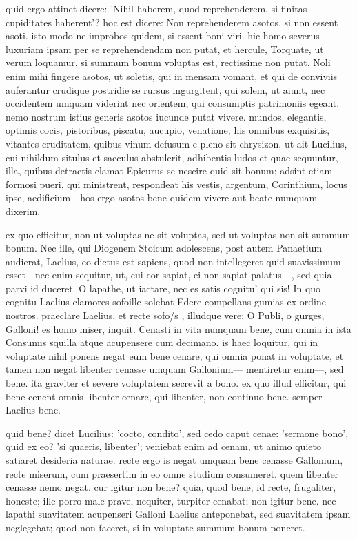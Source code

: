  quid ergo attinet dicere: 'Nihil haberem, quod reprehenderem, si finitas cupiditates haberent'? hoc est dicere: Non reprehenderem asotos, si non essent asoti. isto modo ne improbos quidem, si essent boni viri. hic homo severus luxuriam ipsam per se reprehendendam non putat, et hercule, Torquate, ut verum loquamur, si summum bonum voluptas est, rectissime non putat. Noli enim mihi fingere asotos, ut soletis, qui in mensam vomant, et qui de conviviis auferantur crudique postridie se rursus ingurgitent, qui solem, ut aiunt, nec occidentem umquam viderint nec orientem, qui consumptis patrimoniis egeant. nemo nostrum istius generis asotos iucunde putat vivere. mundos, elegantis, optimis cocis, pistoribus, piscatu, aucupio, venatione, his omnibus exquisitis, vitantes cruditatem, quibus vinum defusum e pleno sit chrysizon, ut ait Lucilius, cui nihildum situlus et sacculus abstulerit, adhibentis ludos et quae sequuntur, illa, quibus detractis clamat Epicurus se nescire quid sit bonum; adsint etiam formosi pueri, qui ministrent, respondeat his vestis, argentum, Corinthium, locus ipse, aedificium—hos ergo asotos bene quidem vivere aut beate numquam dixerim.

 ex quo efficitur, non ut voluptas ne sit voluptas, sed ut voluptas non sit summum bonum. Nec ille, qui Diogenem Stoicum adolescens, post autem Panaetium audierat, Laelius, eo dictus est sapiens, quod non intellegeret quid suavissimum esset—nec enim sequitur, ut, cui cor sapiat, ei non sapiat palatus—, sed quia parvi id duceret. O lapathe, ut iactare, nec es satis cognitu' qui sis! In quo cognitu Laelius clamores sofo\s ille solebat Edere compellans gumias ex ordine nostros. praeclare Laelius, et recte sofo/s , illudque vere: O Publi, o gurges, Galloni! es homo miser, inquit. Cenasti in vita numquam bene, cum omnia in ista Consumis squilla atque acupensere cum decimano. is haec loquitur, qui in voluptate nihil ponens negat eum bene cenare, qui omnia ponat in voluptate, et tamen non negat libenter cenasse umquam Gallonium— mentiretur enim—, sed bene. ita graviter et severe voluptatem secrevit a bono. ex quo illud efficitur, qui bene cenent omnis libenter cenare, qui libenter, non continuo bene. semper Laelius bene.

 quid bene? dicet Lucilius: 'cocto, condito', sed cedo caput cenae: 'sermone bono', quid ex eo? 'si quaeris, libenter'; veniebat enim ad cenam, ut animo quieto satiaret desideria naturae. recte ergo is negat umquam bene cenasse Gallonium, recte miserum, cum praesertim in eo omne studium consumeret. quem libenter cenasse nemo negat. cur igitur non bene? quia, quod bene, id recte, frugaliter, honeste; ille porro male prave, nequiter, turpiter cenabat; non igitur bene. nec lapathi suavitatem acupenseri Galloni Laelius anteponebat, sed suavitatem ipsam neglegebat; quod non faceret, si in voluptate summum bonum poneret.

